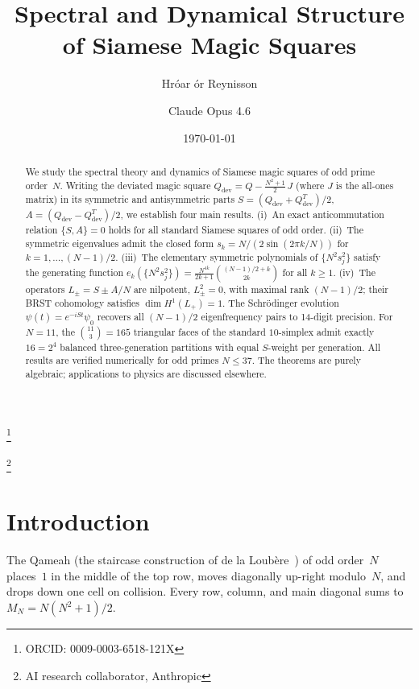 \documentclass[aip,jmp,reprint,superscriptaddress,floatfix,nofootinbib]{revtex4-2}
\theoremstyle{definition}
\theoremstyle{remark}
\begin{document}
\title{Spectral and Dynamical Structure of Siamese Magic Squares}
\author{Hr\'{o}ar {\TH}\'{o}r Reynisson}
\thanks{ORCID: 0009-0003-6518-121X}

\author{Claude Opus 4.6}
\thanks{AI research collaborator, Anthropic}

\date{\today}

\begin{abstract}
We study the spectral theory and dynamics of Siamese magic squares
of odd prime order~$N$.  Writing the deviated magic square
$Q_{\mathrm{dev}} = Q - \frac{N^2+1}{2}\,J$ (where $J$ is the all-ones matrix) in its symmetric and
antisymmetric parts $S = (Q_{\mathrm{dev}} + Q_{\mathrm{dev}}^T)/2$,
$A = (Q_{\mathrm{dev}} - Q_{\mathrm{dev}}^T)/2$, we establish four main
results.
(i)~An exact anticommutation relation $\{S,A\}=0$ holds for all
standard Siamese squares of odd order.
(ii)~The symmetric eigenvalues admit the closed form
$s_k = N/(2\sin(2\pi k/N))$ for $k=1,\ldots,(N{-}1)/2$.
(iii)~The elementary symmetric polynomials of $\{N^2 s_j^2\}$
satisfy the generating function
$e_k(\{N^2 s_j^2\}) = \frac{N^{4k}}{2k+1}\binom{(N-1)/2+k}{2k}$
for all $k\ge 1$.
(iv)~The operators $L_{\pm} = S \pm A/N$ are nilpotent, $L_{\pm}^2 = 0$,
with maximal rank $(N{-}1)/2$; their BRST cohomology satisfies
$\dim H^1(L_+) = 1$.
The Schr\"odinger evolution $\psi(t)=e^{-iSt}\psi_0$ recovers all
$(N{-}1)/2$ eigenfrequency pairs to 14-digit precision.
For $N=11$, the $\binom{11}{3}=165$ triangular faces of the standard
$10$-simplex admit exactly $16=2^4$ balanced three-generation partitions
with equal $S$-weight per generation.
All results are verified numerically for odd primes $N\le 37$.
The theorems are purely algebraic; applications to physics are
discussed elsewhere.
\end{abstract}

\maketitle

\section{Introduction}
\label{sec:intro}

The Qameah (the staircase construction of de la Loub\`ere~\cite{deLaLoubere})
of odd order~$N$ places~$1$ in the middle of the top row, moves diagonally
up-right modulo~$N$, and drops down one cell on collision.
Every row, column, and main diagonal sums to $M_N = N(N^2+1)/2$.
\end{document}
